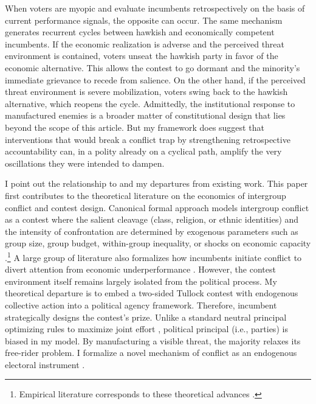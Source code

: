 \documentclass[11pt,twoside]{extarticle}
\begin{document}

When voters are myopic and evaluate incumbents retrospectively on the basis of current performance signals, the opposite can occur. The same mechanism generates recurrent cycles between hawkish and economically competent incumbents. If the economic realization is adverse and the perceived threat environment is contained, voters unseat the hawkish party in favor of the economic alternative. This allows the contest to go dormant and the minority's immediate grievance to recede from salience. On the other hand, if the perceived threat environment is severe mobilization, voters swing back to the hawkish alternative, which reopens the cycle. Admittedly, the institutional response to manufactured enemies is a broader matter of constitutional design that lies beyond the scope of this article. But my framework does suggest that interventions that would break a conflict trap by strengthening retrospective accountability can, in a polity already on a cyclical path, amplify the very oscillations they were intended to dampen.


I point out the relationship to and my departures from existing work. This paper first contributes to the theoretical literature on the economics of intergroup conflict and contest design. 
Canonical formal approach models intergroup conflict as a contest where the salient cleavage (class, religion, or ethnic identities) and the intensity of confrontation are determined by exogenous parameters such as group size, group budget, within-group inequality, or shocks on economic capacity \citep*{estebanConflictDistribution1999, estebanSalienceEthnicConflict2008, caselliTheoryEthnicConflict2006, acharyaElectoralCampaignsDynamic2024}.\footnote{Empirical literature corresponds to these theoretical advances \citep{dalbóWORKERSWARRIORSCRIMINALS2011, rohnerWarSignalsTheory2013, dubeCommodityPriceShocks2013}.} A large group of literature also formalizes how incumbents initiate conflict to divert attention from economic underperformance \citep*{hessWarDemocracy2001}. However, the contest environment itself remains largely isolated from the political process. My theoretical departure is to embed a two-sided Tullock contest \citep*{skaperdasContestSuccessFunctions1996,jiaStochasticDerivationRatio2008} with endogenous collective action into a political agency framework. Therefore, incumbent strategically designs the contest's prize. Unlike a standard neutral principal optimizing rules to maximize joint effort \citep*{barutSymmetricMultiplePrize1998,fangTurningHeatDiscouraging2020}, political principal (i.e., parties) is biased in my model. By manufacturing a visible threat, the majority relaxes its free-rider problem. I formalize a novel mechanism of conflict as an endogenous electoral instrument \citep{iyerReligiousRiotsElectoral2018, mitraImplicationsEconomicTheory2014}. 
\end{document}
